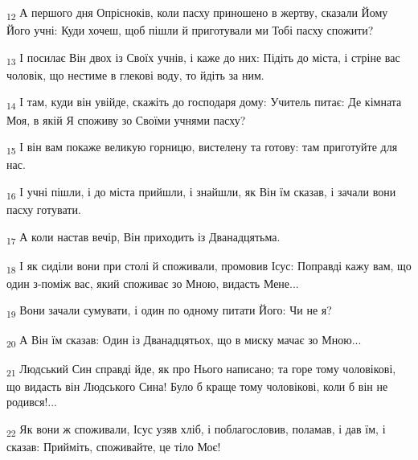 \begin{tcolorbox}
\textsubscript{12} А першого дня Опрісноків, коли пасху приношено в жертву, сказали Йому Його учні: Куди хочеш, щоб пішли й приготували ми Тобі пасху спожити?
\end{tcolorbox}
\begin{tcolorbox}
\textsubscript{13} І посилає Він двох із Своїх учнів, і каже до них: Підіть до міста, і стріне вас чоловік, що нестиме в глекові воду, то йдіть за ним.
\end{tcolorbox}
\begin{tcolorbox}
\textsubscript{14} І там, куди він увійде, скажіть до господаря дому: Учитель питає: Де кімната Моя, в якій Я споживу зо Своїми учнями пасху?
\end{tcolorbox}
\begin{tcolorbox}
\textsubscript{15} І він вам покаже великую горницю, вистелену та готову: там приготуйте для нас.
\end{tcolorbox}
\begin{tcolorbox}
\textsubscript{16} І учні пішли, і до міста прийшли, і знайшли, як Він їм сказав, і зачали вони пасху готувати.
\end{tcolorbox}
\begin{tcolorbox}
\textsubscript{17} А коли настав вечір, Він приходить із Дванадцятьма.
\end{tcolorbox}
\begin{tcolorbox}
\textsubscript{18} І як сиділи вони при столі й споживали, промовив Ісус: Поправді кажу вам, що один з-поміж вас, який споживає зо Мною, видасть Мене...
\end{tcolorbox}
\begin{tcolorbox}
\textsubscript{19} Вони зачали сумувати, і один по одному питати Його: Чи не я?
\end{tcolorbox}
\begin{tcolorbox}
\textsubscript{20} А Він їм сказав: Один із Дванадцятьох, що в миску мачає зо Мною...
\end{tcolorbox}
\begin{tcolorbox}
\textsubscript{21} Людський Син справді йде, як про Нього написано; та горе тому чоловікові, що видасть він Людського Сина! Було б краще тому чоловікові, коли б він не родився!...
\end{tcolorbox}
\begin{tcolorbox}
\textsubscript{22} Як вони ж споживали, Ісус узяв хліб, і поблагословив, поламав, і дав їм, і сказав: Прийміть, споживайте, це тіло Моє!
\end{tcolorbox}
